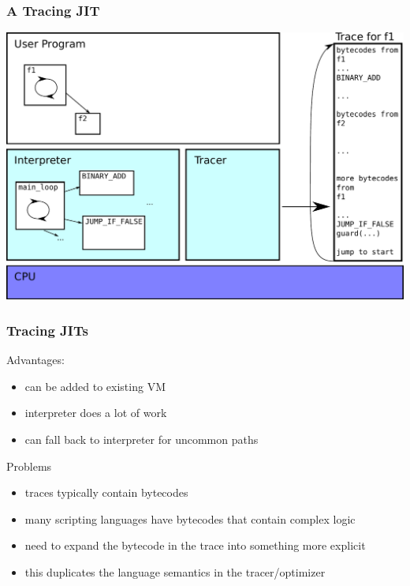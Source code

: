 \documentclass[utf8x]{beamer}
\begin{document}
\begin{frame}
  \frametitle{A Tracing JIT}
  \includegraphics[scale=0.5]{figures/trace04.pdf}
\end{frame}

\begin{frame}
  \frametitle{Tracing JITs}
  Advantages:
  \begin{itemize}
      \item can be added to existing VM
      \item interpreter does a lot of work
      \item can fall back to interpreter for uncommon paths
  \end{itemize}
  \pause
  \begin{block}{Problems}
      \begin{itemize}
          \item traces typically contain bytecodes
          \item many scripting languages have bytecodes that contain complex logic
          \item need to expand the bytecode in the trace into something more explicit
          \item this duplicates the language semantics in the tracer/optimizer
      \end{itemize}
  \end{block}
\end{frame}
\end{document}

